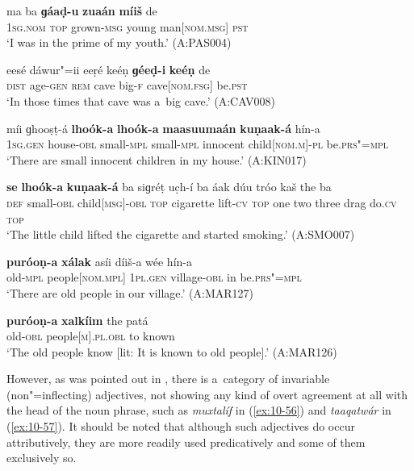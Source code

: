 \begin{exe}
\ex
\label{ex:10-50}
\gll ma ba \textbf{ɡáaḍ-u} \textbf{zuaán} \textbf{míiš} de \\
\textsc{1sg.nom} \textsc{top} grown-\textsc{msg} young man[\textsc{nom}.\textsc{msg}] \textsc{pst} \\
\glt `I was in the prime of my youth.' (A:PAS004)

\ex
\label{ex:10-51}
\gll eesé dáwur"=ii eeṛé keéṇ \textbf{ɡéeḍ-i} \textbf{keéṇ} de \\
\textsc{dist} age-\textsc{gen} \textsc{rem} cave big-\textsc{f} cave[\textsc{nom}.\textsc{fsg}] be.\textsc{pst} \\
\glt `In those times that cave was a~big cave.' (A:CAV008)

\ex
\label{ex:10-52}
\gll míi ɡhooṣṭ-á \textbf{lhoók-a} \textbf{lhoók-a} \textbf{maasuumaán} \textbf{kuṇaak-á} hín-a \\
\textsc{1sg.gen} house-\textsc{obl} small-\textsc{mpl} small-\textsc{mpl}  innocent child[\textsc{nom.m}]-\textsc{pl} be.\textsc{prs"=mpl}\\
\glt `There are small innocent children in my house.' (A:KIN017)

\ex
\label{ex:10-53}
\gll \textbf{se} \textbf{lhoók-a} \textbf{kuṇaak-á} ba siɡréṭ uc̣h-í ba áak dúu tróo kaš the ba \\
\textsc{def} small-\textsc{obl} child[\textsc{msg}]-\textsc{obl} \textsc{top} cigarette lift-\textsc{cv} \textsc{top } one two three drag do.\textsc{cv} \textsc{top}  \\
\glt `The little child lifted the cigarette and started smoking.' (A:SMO007)

\ex
\label{ex:10-54}
\gll \textbf{puróoṇ-a} \textbf{xálak} asíi díiš-a wée hín-a \\
old-\textsc{mpl} people[\textsc{nom.mpl}] \textsc{1pl.gen} village-\textsc{obl} in be.\textsc{prs"=mpl} \\
\glt `There are old people in our village.' (A:MAR127)

\ex
\label{ex:10-55}
\gll \textbf{puróoṇ-a} \textbf{xalkíim} the patá \\
old-\textsc{obl} people[\textsc{m}].\textsc{pl.obl} to known \\
\glt `The old people know [lit: It is known to old people].' (A:MAR126)
\end{exe}


However, as was pointed out in , there is a~category of invariable (non"=inflecting) adjectives, not showing any kind of overt agreement at all with the head of the noun phrase, such as \textit{muxtalíf} in (\ref{ex:10-56}) and \textit{taaqatwár} in (\ref{ex:10-57}). It should be noted that although such adjectives do occur attributively, they are more readily used predicatively and some of them exclusively so.


